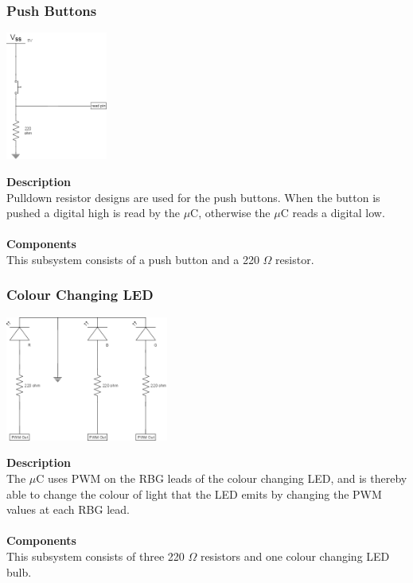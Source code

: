 \documentclass[titlepage]{article}
\begin{document}
\subsubsection{Push Buttons}
\begin{center}
	\includegraphics[width = 0.25\textwidth]{PushButton.png}
\label{fig:PushButtonFig}
\end{center}
\textbf{Description}\\
Pulldown resistor designs are used for the push buttons. When the button is pushed a digital high is read by the $\mu$C, otherwise the $\mu$C reads a digital low.\\\\
\textbf{Components}\\
This subsystem consists of a push button and a 220 $\Omega$ resistor.

\subsubsection{Colour Changing LED}
\begin{center}
	\includegraphics[width = 0.4\textwidth]{ColourChangingLED.png}
\label{fig:ColourChangingLEDFig}
\end{center}
\textbf{Description}\\
The $\mu$C uses PWM on the RBG leads of the colour changing LED, and is thereby able to change the colour of light that the LED emits by changing the PWM values at each RBG lead.\\\\
\textbf{Components}\\
This subsystem consists of three 220 $\Omega$ resistors and one colour changing LED bulb.
\end{document}
